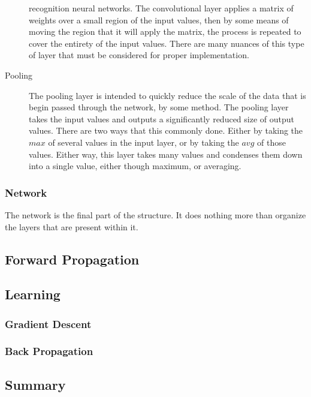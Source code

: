 \documentclass[10pt]{amsart}
\begin{document}
\begin{multicols}{2}
\begin{description}
      recognition neural networks. The convolutional layer applies a matrix of
      weights over a small region of the input values, then by some means of
      moving the region that it will apply the matrix, the process is repeated
      to cover the entirety of the input values. There are many nuances of
      this type of layer that must be considered for proper implementation.
    \item[Pooling] The pooling layer is intended to quickly reduce the scale of
      the data that is begin passed through the network, by some method. The
      pooling layer takes the input values and outputs a significantly reduced
      size of output values. There are two ways that this commonly done. Either
      by taking the $max$ of several values in the input layer, or by taking
      the $avg$ of those values. Either way, this layer takes many values and
      condenses them down into a single value, either though maximum, or
      averaging.
  \end{description}

  \subsubsection{Network}%
  \label{ssub:network}

  The network is the final part of the structure. It does nothing more than
  organize the layers that are present within it.

  \subsection{Forward Propagation}%
  \label{sub:forward_propagation}

  \subsection{Learning}%
  \label{sub:learning}

  \subsubsection{Gradient Descent}%
  \label{ssub:gradient_descent}

  \subsubsection{Back Propagation}%
  \label{ssub:back_propagation}

  \subsection{Summary}%
  \label{sub:summary}


\end{multicols}
\end{document}
